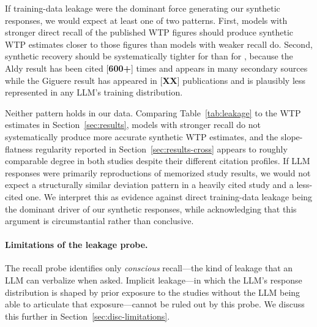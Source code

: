 \documentclass[12pt]{article}
\begin{document}
If training-data leakage were the dominant force generating our synthetic
responses, we would expect at least one of two patterns. First, models
with stronger direct recall of the published WTP figures should produce
synthetic WTP estimates closer to those figures than models with weaker
recall do. Second, synthetic recovery should be systematically tighter
for \textcite{Aldy2012} than for \textcite{Giguere2020}, because the Aldy
result has been cited [\textbf{600+}] times and appears in many secondary
sources while the Giguere result has appeared in [\textbf{XX}]
publications and is plausibly less represented in any LLM's training
distribution.

Neither pattern holds in our data. Comparing Table~\ref{tab:leakage} to
the WTP estimates in Section~\ref{sec:results}, models with stronger
recall do not systematically produce more accurate synthetic WTP
estimates, and the slope-flatness regularity reported in
Section~\ref{sec:results-cross} appears to roughly comparable degree in
both studies despite their different citation profiles. If LLM responses
were primarily reproductions of memorized study results, we would not
expect a structurally similar deviation pattern in a heavily cited study
and a less-cited one. We interpret this as evidence against direct
training-data leakage being the dominant driver of our synthetic
responses, while acknowledging that this argument is circumstantial
rather than conclusive.

\paragraph{Limitations of the leakage probe.} The recall probe identifies
only \emph{conscious} recall---the kind of leakage that an LLM can
verbalize when asked. Implicit leakage---in which the LLM's response
distribution is shaped by prior exposure to the studies without the LLM
being able to articulate that exposure---cannot be ruled out by this
probe. We discuss this further in Section~\ref{sec:disc-limitations}.
\end{document}
